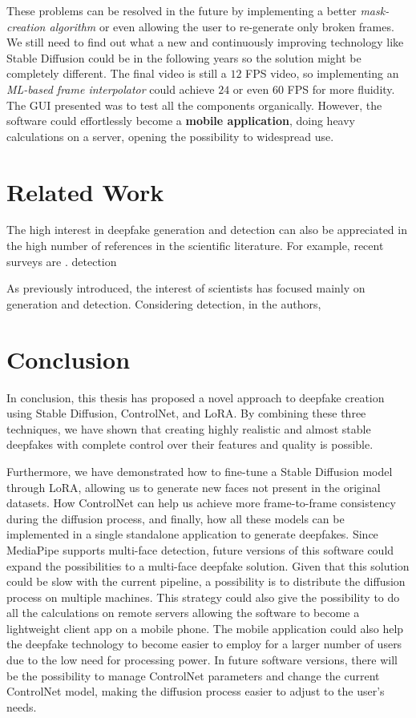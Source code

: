 \documentclass[preprint]{elsarticle}
\begin{document}
These problems can be resolved in the future by implementing a better \emph{mask-creation algorithm} or even allowing the user to re-generate only broken frames. We still need to find out what a new and continuously improving technology like Stable Diffusion could be in the following years so the solution might be completely different. The final video is still a $12$ FPS video, so implementing an \emph{ML-based frame interpolator} could achieve  $24$ or even $60$ FPS for more fluidity.  The GUI presented was to test all the components organically. However, the software could effortlessly become a \textbf{mobile application}, doing heavy calculations on a server, opening the possibility to widespread use.


\section{Related Work}\label{sect:related}
The high interest in deepfake generation and detection can also be appreciated in the high number of references in the scientific literature. For example, recent surveys are \cite{survey1,survey2}. detection~\cite{surveydet}

As previously introduced, the interest of scientists has focused mainly on generation and detection. Considering detection, in \cite{detection1} the authors,



\section{Conclusion}\label{ch:conclusion}
In conclusion, this thesis has proposed a novel approach to deepfake creation using Stable Diffusion, ControlNet, and LoRA. By combining these three techniques, we have shown that creating highly realistic and almost stable deepfakes with complete control over their features and quality is possible. 

Furthermore, we have demonstrated how to fine-tune a Stable Diffusion model through LoRA,  allowing us to generate new faces not present in the original datasets. How ControlNet can help us achieve more frame-to-frame consistency during the diffusion process, and finally, how all these models can be implemented in a single standalone application to generate deepfakes. Since MediaPipe supports multi-face detection, future versions of this software could expand the possibilities to a multi-face deepfake solution. Given that this solution could be slow with the current pipeline, a possibility is to distribute the diffusion process on multiple machines. This strategy could also give the possibility to do all the calculations on remote servers allowing the software to become a lightweight client app on a mobile phone. The mobile application could also help the deepfake technology to become easier to employ for a larger number of users due to the low need for processing power. In future software versions, there will be the possibility to manage ControlNet parameters and change the current ControlNet model, making the diffusion process easier to adjust to the user's needs.
\end{document}

